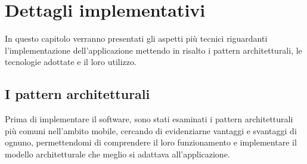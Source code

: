 \documentclass[12pt]{report}
\begin{document}
\chapter{Dettagli implementativi}
In questo capitolo verranno presentati gli aspetti più tecnici riguardanti l'implementazione dell'applicazione mettendo in risalto i pattern architetturali, le tecnologie adottate e il loro utilizzo. 
\section{I pattern architetturali}
Prima di implementare il software, sono stati esaminati i pattern architetturali più comuni nell'ambito mobile, cercando di evidenziarne vantaggi e svantaggi di ognuno, permettendomi di comprendere il loro funzionamento e implementare il modello architetturale che meglio si adattava all'applicazione.
\end{document}
